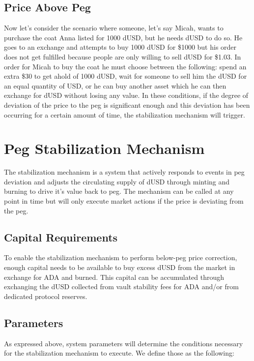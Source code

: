 \documentclass[12pt]{article}
\begin{document}
\subsection{Price Above Peg}

Now let's consider the scenario where someone, let's say Micah, wants to purchase the coat Anna listed for 1000 dUSD, but he needs dUSD to do so. He goes to an exchange and attempts to buy 1000 dUSD for \$1000 but his order does not get fulfilled because people are only willing to sell dUSD for \$1.03. In order for Micah to buy the coat he must choose between the following: spend an extra \$30 to get ahold of 1000 dUSD, wait for someone to sell him the dUSD for an equal quantity of USD, or he can buy another asset which he can then exchange for dUSD without losing any value. In these conditions, if the degree of deviation of the price to the peg is significant enough and this deviation has been occurring for a certain amount of time, the stabilization mechanism will trigger. 

\section{Peg Stabilization Mechanism}

The stabilization mechanism is a system that actively responds to events in peg deviation and adjusts the circulating supply of dUSD through minting and burning to drive it's value back to peg. The mechanism can be called at any point in time but will only execute market actions if the price is deviating from the peg.

\subsection{Capital Requirements}
To enable the stabilization mechanism to perform below-peg price correction, enough capital needs to be available to buy excess dUSD from the market in exchange for ADA and burned. This capital can be accumulated through exchanging the dUSD collected from vault stability fees for ADA and/or from dedicated protocol reserves.

\subsection{Parameters}

As expressed above, system parameters will determine the conditions necessary for the stabilization mechanism to execute. We define those as the following:
\end{document}
